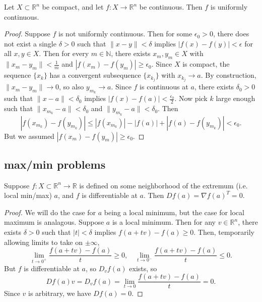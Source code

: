 \documentclass[12pt]{article}
\begin{document}
\begin{theorem}
	Let $X\subset\mathbb{R}^n$ be compact, and let $f:X\to\mathbb{R}^n$ be continuous. Then $f$ is uniformly continuous.
\end{theorem}
\begin{proof} 
	Suppose $f$ is not uniformly continuous. Then for some $\epsilon_0>0$, there does not exist a single $\delta>0$ such that $\|x-y\|<\delta$ implies $|f(x)-f(y)|<\epsilon$ for all $x,y\in X$. Then for every $m\in\mathbb{N}$, there exists $x_m,y_m\in X$ with $\|x_m-y_m\|<\frac{1}{m}$ and $|f(x_m)-f(y_m)|\geq\epsilon_0$. Since $X$ is compact, the sequence $\{x_k\}$ has a convergent subsequence $\{x_{k_j}\}$ with $x_{k_j}\to a$. By construction, $\|x_m-y_m\|\to 0$, so also $y_{m_k}\to a$. Since $f$ is continuous at $a$, there exists $\delta_0>0$ such that $\|x-a\|<\delta_0$ implies $|f(x)-f(a)|<\frac{\epsilon_0}{2}$. Now pick $k$ large enough such that $\|x_{m_k}-a\|<\delta_0$ and $\|y_{m_k}-a\|<\delta_0$. Then 
	\begin{equation*}
		|f(x_{m_k})-f(y_{m_k})| \leq |f(x_{m_k})| - |f(a)| + |f(a)-f(y_{m_k})| < \epsilon_0.
	\end{equation*}
	But we assumed $|f(x_m)-f(y_m)|\geq\epsilon_0$.
\end{proof}	


\subsection{max/min problems} %

\begin{lemma}
	Suppose $f:X\subset\mathbb{R}^n \to\mathbb{R}$ is defined on some neighborhood of the extremum (i.e. local min/max) $a$, and $f$ is differentiable at $a$. Then $Df(a)=\nabla f(a)^T=0$.
\end{lemma}
\begin{proof}
	We will do the case for $a$ being a local minimum, but the case for local maximum is analagous. Suppose $a$ is a local minimum. Then for any $v\in\mathbb{R}^n$, there exists $\delta>0$ such that $|t|<\delta$ implies $f(a+tv)-f(a)\geq 0$. Then, temporarily allowing limits to take on $\pm\infty$,
	\begin{equation*}
		\lim_{t\to 0^+}\frac{f(a+tv)-f(a)}{t}\geq 0, \quad \lim_{t\to 0^-}\frac{f(a+tv)-f(a)}{t}\leq 0.
	\end{equation*}
	But $f$ is differentiable at $a$, so $D_vf(a)$ exists, so 
	\begin{equation*}
		Df(a)v = D_vf(a) = \lim_{t\to 0}\frac{f(a+tv)-f(a)}{t}=0.
	\end{equation*}
	Since $v$ is arbitrary, we have $Df(a)=0$.
\end{proof}
\end{document}
